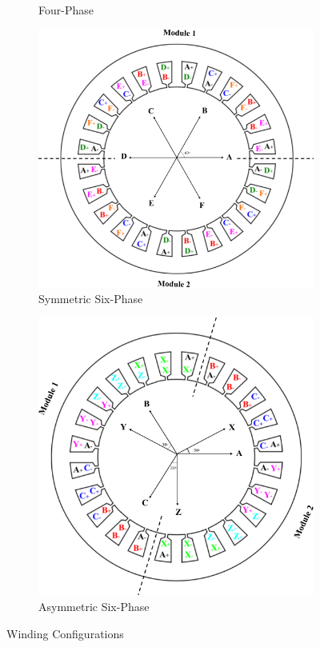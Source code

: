 \documentclass[a4paper,11pt]{article}
\begin{document}
\begin{figure}[ht!]
\begin{subfigure}[b]{0.24\textwidth}
    \caption{Four-Phase}
    \label{fig:4ph}    
\end{subfigure}
\begin{subfigure}[b]{0.24\textwidth}
    \centering
    \includegraphics[width=\linewidth]{sym6ph.png}
    \caption{Symmetric Six-Phase}
    \label{fig:s6ph}    
\end{subfigure}
\begin{subfigure}[b]{0.24\textwidth}
    \centering
    \includegraphics[width=\linewidth]{asym6ph.png}
    \caption{Asymmetric Six-Phase}
    \label{fig:as6ph}    
\end{subfigure}
 \caption{Winding Configurations}
 \label{fig:windings}
\end{figure}
\end{document}
